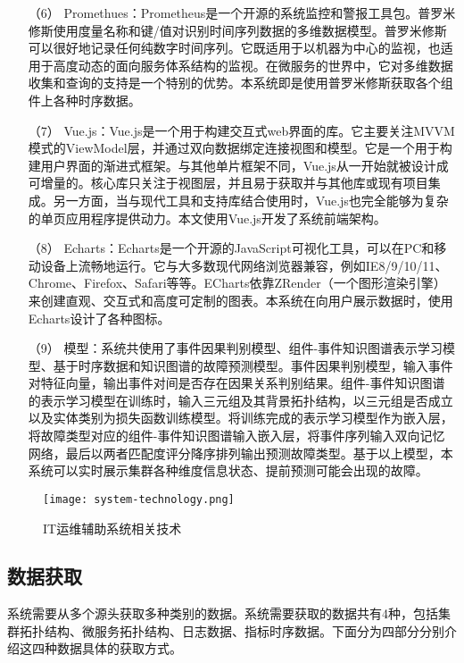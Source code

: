 \begin{itemize}
    \item [（6）]Promethues：Prometheus是一个开源的系统监控和警报工具包。普罗米修斯使用度量名称和键/值对识别时间序列数据的多维数据模型。普罗米修斯可以很好地记录任何纯数字时间序列。它既适用于以机器为中心的监视，也适用于高度动态的面向服务体系结构的监视。在微服务的世界中，它对多维数据收集和查询的支持是一个特别的优势。本系统即是使用普罗米修斯获取各个组件上各种时序数据。
    \item [（7）]Vue.js：Vue.js是一个用于构建交互式web界面的库。它主要关注MVVM模式的ViewModel层，并通过双向数据绑定连接视图和模型。它是一个用于构建用户界面的渐进式框架。与其他单片框架不同，Vue.js从一开始就被设计成可增量的。核心库只关注于视图层，并且易于获取并与其他库或现有项目集成。另一方面，当与现代工具和支持库结合使用时，Vue.js也完全能够为复杂的单页应用程序提供动力。本文使用Vue.js开发了系统前端架构。
    \item [（8）]Echarts：Echarts是一个开源的JavaScript可视化工具，可以在PC和移动设备上流畅地运行。它与大多数现代网络浏览器兼容，例如IE8/9/10/11、Chrome、Firefox、Safari等等。ECharts依靠ZRender（一个图形渲染引擎）来创建直观、交互式和高度可定制的图表。本系统在向用户展示数据时，使用Echarts设计了各种图标。
    \item [（9）]模型：系统共使用了事件因果判别模型、组件-事件知识图谱表示学习模型、基于时序数据和知识图谱的故障预测模型。事件因果判别模型，输入事件对特征向量，输出事件对间是否存在因果关系判别结果。组件-事件知识图谱的表示学习模型在训练时，输入三元组及其背景拓扑结构，以三元组是否成立以及实体类别为损失函数训练模型。将训练完成的表示学习模型作为嵌入层，将故障类型对应的组件-事件知识图谱输入嵌入层，将事件序列输入双向记忆网络，最后以两者匹配度评分降序排列输出预测故障类型。基于以上模型，本系统可以实时展示集群各种维度信息状态、提前预测可能会出现的故障。
\end{itemize}

\begin{figure}[htbp]
    \centering
    \texttt{[image: system-technology.png]}
    \caption{IT运维辅助系统相关技术\label{system-technology}}
\end{figure}



\subsection{数据获取}\label{data-collect-way}
系统需要从多个源头获取多种类别的数据。系统需要获取的数据共有4种，包括集群拓扑结构、微服务拓扑结构、日志数据、指标时序数据。下面分为四部分分别介绍这四种数据具体的获取方式。


